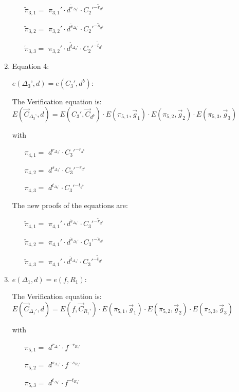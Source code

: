 \begin{description}
\begin{enumerate}
    \begin{itemize}
    \item[$\tilde{\pi}_{3,1} = $] $\pi_{3,1}' \cdot d^{\tilde{r}_{\Delta_2'}} \cdot C_2'^{-\tilde{r}_{d^b}}$ 
    \item[$\tilde{\pi}_{3,2} = $] $\pi_{3,2}' \cdot d^{\tilde{s}_{\Delta_2’}} \cdot C_2'^{-\tilde{s}_{d^b}}$    
    \item[$\tilde{\pi}_{3,3} = $] $\pi_{3,2}' \cdot d^{\tilde{t}_{\Delta_2'}} \cdot C_2'^{-\tilde{t}_{d^b}}$ 
    \end{itemize}

    
  \item Equation 4:

    $e(\boxed{\Delta_3’},d) = e(C_3', \boxed{d^b})$:
    
    The Verification equation is:  $E(\vec{C}_{\Delta_3’}, d) = E(C_3', \vec{C}_{d^b}) \cdot E(\pi_{5,1}, \vec{g}_1)\cdot E(\pi_{5,2}, \vec{g}_2)\cdot E(\pi_{5,3}, \vec{g}_3)$
    
    with
    \begin{itemize}
    \item[$\pi_{4,1} = $] $d^{r_{\Delta_3’}} \cdot C_3'^{-r_{d^b}}$
    \item[$\pi_{4,2} = $] $d^{s_{\Delta_3'}} \cdot C_3'^{-s_{d^b}}$
    \item[$\pi_{4,3} = $] $d^{t_{\Delta_3’}} \cdot C_3'^{-t_{d^b}}$
    \end{itemize}

    The new proofs of the equations are:

    \begin{itemize}
    \item[$\tilde{\pi}_{4,1} = $] $\pi_{4,1}' \cdot d^{\tilde{r}_{\Delta_3’}} \cdot C_3'^{-\tilde{r}_{d^b}}$
    \item[$\tilde{\pi}_{4,2} = $] $\pi_{4,1}' \cdot d^{\tilde{s}_{\Delta_3'}} \cdot C_3’^{-\tilde{s}_{d^b}}$
    \item[$\tilde{\pi}_{4,3} = $] $\pi_{4,1}' \cdot d^{\tilde{t}_{\Delta_3’}} \cdot C_3'^{-\tilde{t}_{d^b}}$
    \end{itemize}

  \item $e(\boxed{\Delta_1},d) = e(f, \boxed{R_1})$:
    
    The Verification equation is:  $E(\vec{C}_{\Delta_1'}, d) = E(f, \vec{C}_{R_1’}) \cdot E(\pi_{5,1}, \vec{g}_1)\cdot E(\pi_{5,2}, \vec{g}_2)\cdot E(\pi_{5,3}, \vec{g}_3)$
    
    with
    \begin{itemize}
    \item[$\pi_{5,1} = $] $d^{r_{\Delta_1'}} \cdot f^{-r_{R_1’}}$
    \item[$\pi_{5,2} = $] $d^{s_{\Delta_1’}} \cdot f^{-s_{R_1'}}$
    \item[$\pi_{5,3} = $] $d^{t_{\Delta_1'}} \cdot f^{-t_{R_1’}}$
    \end{itemize}


\end{enumerate}
\end{description}
